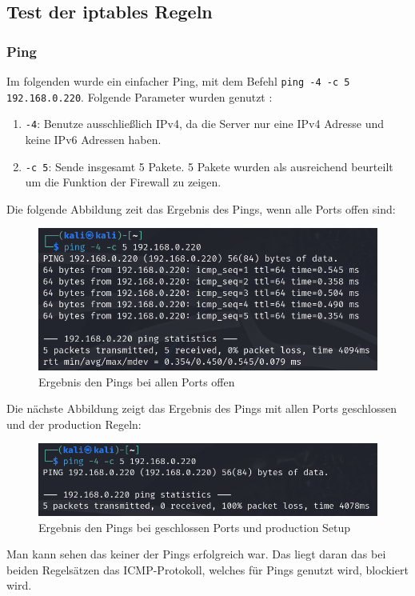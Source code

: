 \documentclass[
    a4paper,
    pagesize,
	pdftex,
    12pt,
]{scrartcl}
\begin{document}
\subsection{Test der iptables Regeln}

\subsubsection{Ping}
Im folgenden wurde ein einfacher Ping, mit dem Befehl \lstinline[breaklines]|ping -4 -c 5 192.168.0.220|.
Folgende Parameter wurden genutzt \cite{ping-manpage}:
\begin{enumerate}
	\item \lstinline[breaklines]|-4|: Benutze ausschließlich IPv4, da die Server nur eine IPv4 Adresse und keine IPv6 Adressen haben.
	\item \lstinline[breaklines]|-c 5|: Sende insgesamt 5 Pakete. 5 Pakete wurden als ausreichend beurteilt um die Funktion der Firewall zu zeigen. 
\end{enumerate}

Die folgende Abbildung zeit das Ergebnis des Pings, wenn alle Ports offen sind:
\begin{figure}[H]
	\centering
	\includegraphics[width=12cm]{ping-all-open.png}
	\caption{Ergebnis den Pings bei allen Ports offen}
	\label{fig:ping-all-open}
\end{figure}

Die nächste Abbildung zeigt das Ergebnis des Pings mit allen Ports geschlossen und der production Regeln:
\begin{figure}[H]
	\centering
	\includegraphics[width=12cm]{ping-all-closed.png}
	\caption{Ergebnis den Pings bei geschlossen Ports und production Setup}
	\label{fig:ping-all-closed}
\end{figure}
Man kann sehen das keiner der Pings erfolgreich war. Das liegt daran das bei beiden Regelsätzen das ICMP-Protokoll, welches für Pings genutzt wird, blockiert wird.
\end{document}
